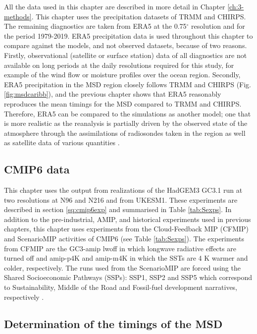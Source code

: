 All the data used in this chapter are described in more detail in Chapter \ref{ch:3-methods}. This chapter uses the precipitation datasets of TRMM and CHIRPS. The remaining diagnostics are taken from ERA5 at the 0.75$^\circ$ resolution and for the period 1979-2019. ERA5 precipitation data is used throughout this chapter to compare against the models, and not observed datasets, because of two reasons. Firstly, observational (satellite or surface station) data of all diagnostics are not available on long periods at the daily resolutions required for this study, for example of the wind flow or moisture profiles over the ocean region. Secondly, ERA5 precipitation in the MSD region closely follows TRMM and CHIRPS (Fig. \ref{fig:msdcaribb}), and the previous chapter shows that ERA5 reasonably reproduces the mean timings for the MSD compared to TRMM and CHIRPS. Therefore, ERA5 can be compared to the simulations as another model; one that is more realistic as the reanalysis is partially driven by the observed state of the atmosphere through the assimilations of radiosondes taken in the region as well as satellite data of various quantities \citep{era5hersbach}.

\subsection{CMIP6 data}\label{sq:ch6cmipdata}

This chapter uses the output from realizations of the HadGEM3 GC3.1 run at two resolutions at N96 and N216 and from UKESM1. These experiments are described in section \ref{sq:cmip6exp} and summarised in Table \ref{tab:Sexps}. In addition to the pre-industrial, AMIP, and historical experiments used in previous chapters, this chapter uses experiments from the Cloud-Feedback MIP (CFMIP) \citep{webb2017} and ScenarioMIP \citep{o2016} activities of CMIP6 (see Table \ref{tab:Sexps}). The experiments from CFMIP are the GC3-amip lwoff in which longwave radiative effects are turned off and amip-p4K and amip-m4K in which the SSTs are 4 K warmer and colder, respectively. The runs used from the ScenarioMIP are forced using the Shared Socioeconomic Pathways (SSPs): SSP1, SSP2 and SSP5  which correspond to Sustainability, Middle of the Road and Fossil-fuel development narratives, respectively \citep{o2017roads}.


\subsection{Determination of the timings of the MSD}

